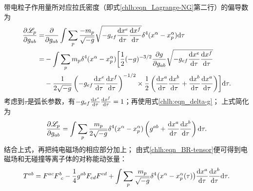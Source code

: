 带电粒子作用量所对应拉氏密度（即式\eqref{chlh:eqn_Lagrange-NG}第二行）的偏导数为
\begin{align*}
    \frac{\partial \mathscr{L}_{p}}{\partial g_{ab}}
    =&\frac{\partial }{\partial g_{ab}} 
    \int \sum_{p}\frac{- m_p }{\sqrt{-g}} \sqrt{-g_{ef} \frac{{\rm d} x^e}{{\rm d} \tau}
        \frac{{\rm d}x^f}{{\rm d} \tau} } \delta^4(x^\alpha-x^\alpha_p) {\rm d} \tau \\
    =& - \int \sum_{p} m_p \delta^4(x^\alpha-x^\alpha_p) \biggl[
    \frac{1}{2}(-g)^{-3/2}  \frac{\partial g}{\partial g_{ab}} 
    \sqrt{-g_{ef} \frac{{\rm d} x^e}{{\rm d} \tau} \frac{{\rm d}x^f}{{\rm d} \tau} } \\
    &-\frac{1}{2\sqrt{-g}} \left(-g_{ef} \frac{{\rm d} x^e}{{\rm d} \tau}
        \frac{{\rm d}x^f}{{\rm d} \tau} \right)^{-1/2} \times \frac{1}{2}
      \left(\frac{{\rm d} x^a}{{\rm d} \tau} \frac{{\rm d}x^b}{{\rm d} \tau} +
      \frac{{\rm d} x^b}{{\rm d} \tau} \frac{{\rm d}x^a}{{\rm d} \tau}\right) \biggr] {\rm d} \tau .
\end{align*}
考虑到$\tau$是弧长参数，有$-g_{ef} \frac{{\rm d} x^e}{{\rm d} \tau}
\frac{{\rm d}x^f}{{\rm d} \tau} = 1$；再使用式\eqref{chlh:eqn_delta-g}；
上式简化为
\begin{equation}
    \frac{\partial \mathscr{L}_{p}}{\partial g_{ab}}
    = \int \sum_{p} \frac{m_p}{2\sqrt{-g}} \delta^4(x^\alpha-x^\alpha_p) 
     \left( g^{ab} + \frac{{\rm d} x^a}{{\rm d} \tau} \frac{{\rm d}x^b}{{\rm d} \tau}
    \right)  {\rm d} \tau .
\end{equation}
结合上式，再把纯电磁场的相应部分加上；
由式\eqref{chlh:eqn_BR-tensor}便可得到电磁场和无碰撞等离子体的对称能动张量：
\setlength{\mathindent}{0em}
\begin{equation}\label{chlh:eqn_EM+Plasma-BRtensor}
    T^{ab} = F^{ac} F^{b}_{\hphantom{b} c} - \frac{1}{4} g^{ab} F_{cd} F^{cd} 
     + \int \sum_{p} \frac{m_p}{\sqrt{-g}} \delta^4\bigl(x^\alpha-x^\alpha_p(\tau)\bigr) 
    \frac{{\rm d} x^a}{{\rm d} \tau} \frac{{\rm d}x^b}{{\rm d} \tau} {\rm d} \tau . %
\end{equation}\setlength{\mathindent}{2em}





